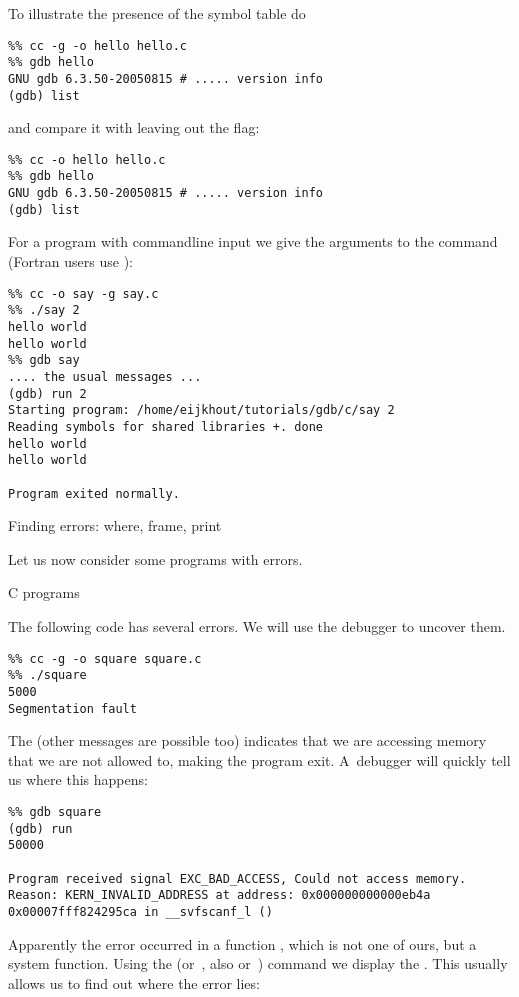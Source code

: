 To illustrate the presence of the symbol table do
\begin{verbatim}
%% cc -g -o hello hello.c
%% gdb hello
GNU gdb 6.3.50-20050815 # ..... version info
(gdb) list
\end{verbatim}
and compare it with leaving out the  flag:
\begin{verbatim}
%% cc -o hello hello.c
%% gdb hello
GNU gdb 6.3.50-20050815 # ..... version info
(gdb) list
\end{verbatim}

For a program with commandline input we give the arguments to the
 command (Fortran users use ):
\begin{multicols}{2}
  \vfill\columnbreak
\begin{verbatim}
%% cc -o say -g say.c
%% ./say 2
hello world
hello world
%% gdb say
.... the usual messages ...
(gdb) run 2
Starting program: /home/eijkhout/tutorials/gdb/c/say 2
Reading symbols for shared libraries +. done
hello world
hello world

Program exited normally.
\end{verbatim}
\end{multicols}

 {Finding errors: where, frame, print}

Let us now consider some programs with errors.

 {C programs}

The following code has several errors.
We will use the debugger to uncover them.

\begin{verbatim}
%% cc -g -o square square.c
%% ./square
5000
Segmentation fault
\end{verbatim}
The  (other messages are possible too) 
indicates that we are accessing
memory that we are not allowed to, making the program exit.
A~debugger will quickly tell us where this happens:
\begin{verbatim}
%% gdb square
(gdb) run
50000

Program received signal EXC_BAD_ACCESS, Could not access memory.
Reason: KERN_INVALID_ADDRESS at address: 0x000000000000eb4a
0x00007fff824295ca in __svfscanf_l ()
\end{verbatim}

Apparently the error occurred in a function , which is
not one of ours, but a system function. Using the 
(or~, also  or~) command we
display the . This usually allows us to find out
where the error lies:

